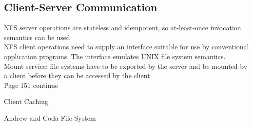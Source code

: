 \begin{multicols*}{2}
\section{Client-Server Communication}
\noindent NFS server operations are stateless and idempotent, so at-least-once invocation semantics can be used\\

\noindent NFS client operations need to supply an interface suitable for use by conventional application programs. The interface emulates UNIX file system semantics. \\

\noindent Mount service: file systems have to be exported by the server and be mounted by a client before they can be accessed by the client\\

Page 151 continue

Client Caching

Andrew and Coda File System

\end{multicols*}
